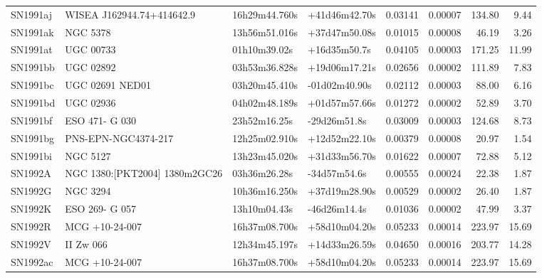 \begin{longtable}{llllrrrr}
SN1991aj         &       WISEA J162944.74+414642.9 &   16h29m44.760s &   +41d46m42.70s &  0.03141 &  0.00007 &   134.80 &        9.44 \\
SN1991ak         &                        NGC 5378 &   13h56m51.016s &   +37d47m50.08s &  0.01015 &  0.00008 &    46.19 &        3.26 \\
SN1991at         &                       UGC 00733 &    01h10m39.02s &    +16d35m50.7s &  0.04105 &  0.00003 &   171.25 &       11.99 \\
SN1991bb         &                       UGC 02892 &   03h53m36.828s &   +19d06m17.21s &  0.02656 &  0.00002 &   111.89 &        7.83 \\
SN1991bc         &                 UGC 02691 NED01 &   03h20m45.410s &   -01d02m40.90s &  0.02112 &  0.00003 &    88.00 &        6.16 \\
SN1991bd         &                       UGC 02936 &   04h02m48.189s &   +01d57m57.66s &  0.01272 &  0.00002 &    52.89 &        3.70 \\
SN1991bf         &                  ESO 471- G 030 &    23h52m16.25s &    -29d26m51.8s &  0.03009 &  0.00003 &   124.68 &        8.73 \\
SN1991bg         &             PNS-EPN-NGC4374-217 &   12h25m02.910s &   +12d52m22.10s &  0.00379 &  0.00008 &    20.97 &        1.54 \\
SN1991bi         &                        NGC 5127 &   13h23m45.020s &   +31d33m56.70s &  0.01622 &  0.00007 &    72.88 &        5.12 \\
SN1992A          &  NGC 1380:[PKT2004] 1380m2GC26  &    03h36m26.28s &    -34d57m54.6s &  0.00555 &  0.00024 &    22.38 &        1.87 \\
SN1992G          &                        NGC 3294 &   10h36m16.250s &   +37d19m28.90s &  0.00529 &  0.00002 &    26.40 &        1.87 \\
SN1992K          &                  ESO 269- G 057 &    13h10m04.43s &    -46d26m14.4s &  0.01036 &  0.00002 &    47.99 &        3.37 \\
SN1992R          &                  MCG +10-24-007 &   16h37m08.700s &   +58d10m04.20s &  0.05233 &  0.00014 &   223.97 &       15.69 \\
SN1992V          &                       II Zw 066 &   12h34m45.197s &   +14d33m26.59s &  0.04650 &  0.00016 &   203.77 &       14.28 \\
SN1992ac         &                  MCG +10-24-007 &   16h37m08.700s &   +58d10m04.20s &  0.05233 &  0.00014 &   223.97 &       15.69 \\

\end{longtable}
